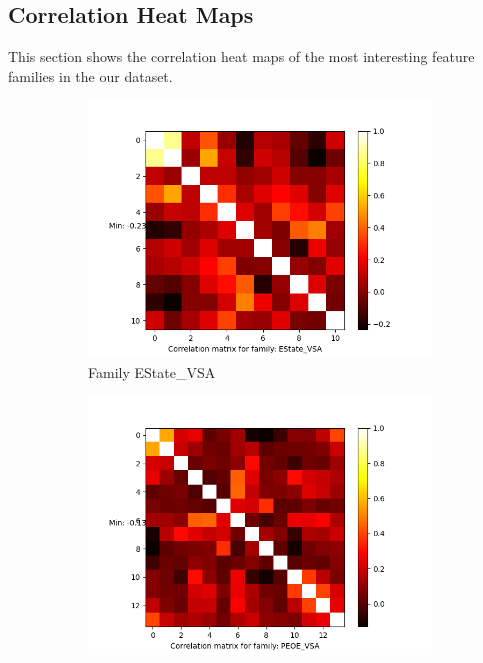\documentclass[11pt]{article}
\begin{document}
\subsection{Correlation Heat Maps}
\label{CorrHeatMapsAppendix}
This section shows the correlation heat maps of the most interesting feature families in the our dataset.
\begin{figure}
     \centering
     \begin{subfigure}[b]{0.45\textwidth}
         \centering
    \includegraphics[scale=0.5]{images/correlationEStateVSA}
    \caption{Family EState\_VSA}
    \label{fig:correlationEStateVSA}
     \end{subfigure}
     \hfill
     \begin{subfigure}[b]{0.45\textwidth}
         \centering
        \includegraphics[scale=0.5]{images/correlationPEOEVSA}

\end{subfigure}
\end{figure}
\end{document}
